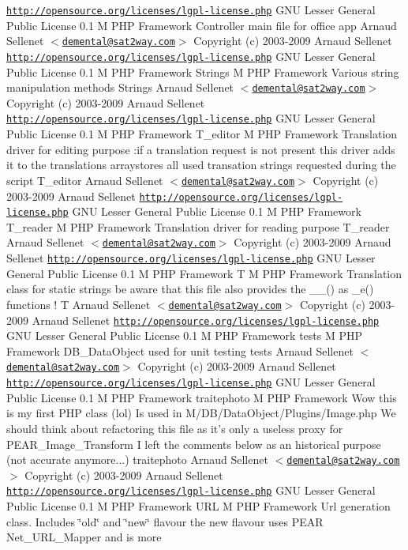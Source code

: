 \begin{Desc}
\href{http://opensource.org/licenses/lgpl-license.php}{\tt http://opensource.org/licenses/lgpl-license.php} GNU Lesser General Public License  0.1  M PHP Framework  Controller main file for office app   Arnaud Sellenet $<$\href{mailto:demental@sat2way.com}{\tt demental@sat2way.com}$>$  Copyright (c) 2003-2009 Arnaud Sellenet  \href{http://opensource.org/licenses/lgpl-license.php}{\tt http://opensource.org/licenses/lgpl-license.php} GNU Lesser General Public License  0.1  M PHP Framework   Strings  M PHP Framework  Various string manipulation methods   Strings  Arnaud Sellenet $<$\href{mailto:demental@sat2way.com}{\tt demental@sat2way.com}$>$  Copyright (c) 2003-2009 Arnaud Sellenet  \href{http://opensource.org/licenses/lgpl-license.php}{\tt http://opensource.org/licenses/lgpl-license.php} GNU Lesser General Public License  0.1  M PHP Framework   T\_\-editor  M PHP Framework  Translation driver for editing purpose :if a translation request is not present this driver adds it to the translations arraystores all used transation strings requested during the script   T\_\-editor  Arnaud Sellenet $<$\href{mailto:demental@sat2way.com}{\tt demental@sat2way.com}$>$  Copyright (c) 2003-2009 Arnaud Sellenet  \href{http://opensource.org/licenses/lgpl-license.php}{\tt http://opensource.org/licenses/lgpl-license.php} GNU Lesser General Public License  0.1  M PHP Framework   T\_\-reader  M PHP Framework  Translation driver for reading purpose   T\_\-reader  Arnaud Sellenet $<$\href{mailto:demental@sat2way.com}{\tt demental@sat2way.com}$>$  Copyright (c) 2003-2009 Arnaud Sellenet  \href{http://opensource.org/licenses/lgpl-license.php}{\tt http://opensource.org/licenses/lgpl-license.php} GNU Lesser General Public License  0.1  M PHP Framework   T  M PHP Framework  Translation class for static strings be aware that this file also provides the \_\-\_\-() as \_\-e() functions !   T  Arnaud Sellenet $<$\href{mailto:demental@sat2way.com}{\tt demental@sat2way.com}$>$  Copyright (c) 2003-2009 Arnaud Sellenet  \href{http://opensource.org/licenses/lgpl-license.php}{\tt http://opensource.org/licenses/lgpl-license.php} GNU Lesser General Public License  0.1  M PHP Framework   tests  M PHP Framework  DB\_\-DataObject used for unit testing   tests  Arnaud Sellenet $<$\href{mailto:demental@sat2way.com}{\tt demental@sat2way.com}$>$  Copyright (c) 2003-2009 Arnaud Sellenet  \href{http://opensource.org/licenses/lgpl-license.php}{\tt http://opensource.org/licenses/lgpl-license.php} GNU Lesser General Public License  0.1  M PHP Framework   traitephoto  M PHP Framework  Wow this is my first PHP class (lol) Is used in M/DB/DataObject/Plugins/Image.php We should think about refactoring this file as it's only a useless proxy for PEAR\_\-Image\_\-Transform I left the comments below as an historical purpose (not accurate anymore...)   traitephoto  Arnaud Sellenet $<$\href{mailto:demental@sat2way.com}{\tt demental@sat2way.com}$>$  Copyright (c) 2003-2009 Arnaud Sellenet  \href{http://opensource.org/licenses/lgpl-license.php}{\tt http://opensource.org/licenses/lgpl-license.php} GNU Lesser General Public License  0.1  M PHP Framework   URL  M PHP Framework  Url generation class. Includes \char`\"{}old\char`\"{} and \char`\"{}new\char`\"{} flavour the new flavour uses PEAR Net\_\-URL\_\-Mapper and is more 
\end{Desc}
